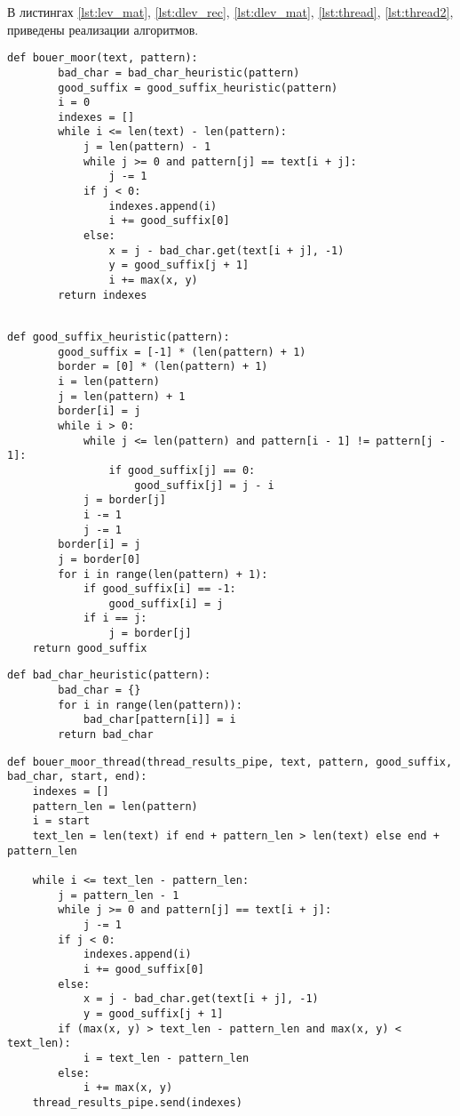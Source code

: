 В листингах \ref{lst:lev_mat}, \ref{lst:dlev_rec}, \ref{lst:dlev_mat}, \ref{lst:thread}, \ref{lst:thread2}, приведены реализации алгоритмов.
\newpage
\begin{lstlisting}[label=lst:lev_mat,caption=Алгоритм Бойера--Мура поиска подстроки в строке.]
	def bouer_moor(text, pattern):
		bad_char = bad_char_heuristic(pattern)
		good_suffix = good_suffix_heuristic(pattern)
		i = 0
		indexes = []
		while i <= len(text) - len(pattern):
			j = len(pattern) - 1
			while j >= 0 and pattern[j] == text[i + j]:
				j -= 1
			if j < 0:
				indexes.append(i)
				i += good_suffix[0]
			else:
				x = j - bad_char.get(text[i + j], -1)
				y = good_suffix[j + 1]
				i += max(x, y)
		return indexes
		
\end{lstlisting}
\newpage
\begin{lstlisting}[label=lst:dlev_rec,caption= Эвристика хорошего суффикса]
	def good_suffix_heuristic(pattern):
		good_suffix = [-1] * (len(pattern) + 1)
		border = [0] * (len(pattern) + 1)
		i = len(pattern)
		j = len(pattern) + 1
		border[i] = j
		while i > 0:
			while j <= len(pattern) and pattern[i - 1] != pattern[j - 1]:
				if good_suffix[j] == 0:
					good_suffix[j] = j - i
			j = border[j]
			i -= 1
			j -= 1
		border[i] = j
		j = border[0]
		for i in range(len(pattern) + 1):
			if good_suffix[i] == -1:
				good_suffix[i] = j
			if i == j:
				j = border[j]
	return good_suffix
\end{lstlisting}
\newpage
\begin{lstlisting}[label=lst:dlev_mat,caption=Эвристика плохого символа]
	def bad_char_heuristic(pattern):
		bad_char = {}
		for i in range(len(pattern)):
			bad_char[pattern[i]] = i
		return bad_char
\end{lstlisting}
\newpage
\begin{lstlisting}[label=lst:thread,caption= Схема рабочего потока алгоритм Бойера--Мура]
def bouer_moor_thread(thread_results_pipe, text, pattern, good_suffix, bad_char, start, end):
	indexes = []
	pattern_len = len(pattern)
	i = start
	text_len = len(text) if end + pattern_len > len(text) else end + pattern_len
	
	while i <= text_len - pattern_len:
		j = pattern_len - 1
		while j >= 0 and pattern[j] == text[i + j]:
			j -= 1
		if j < 0:
			indexes.append(i)
			i += good_suffix[0]
		else:
			x = j - bad_char.get(text[i + j], -1)
			y = good_suffix[j + 1]
		if (max(x, y) > text_len - pattern_len and max(x, y) < text_len):
			i = text_len - pattern_len
		else:
			i += max(x, y)
	thread_results_pipe.send(indexes)
\end{lstlisting}
